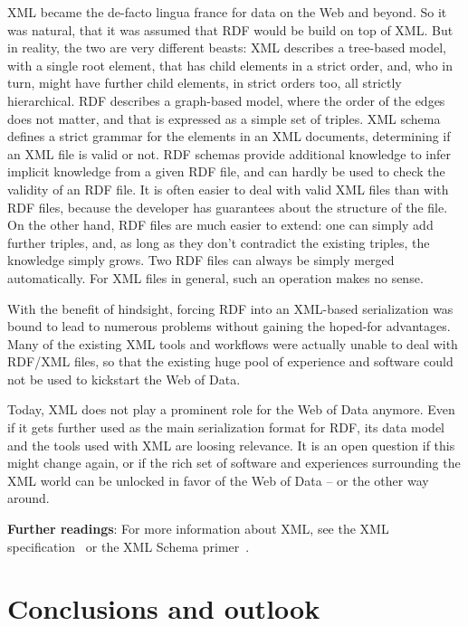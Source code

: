 XML became the de-facto lingua france for data on the Web and beyond.
So it was natural, that it was assumed that RDF would be build on top of XML.
But in reality, the two are very different beasts:
XML describes a tree-based model, with a single root element, that has child elements in a strict order, and, who in turn, might have further child elements, in strict orders too, all strictly hierarchical.
RDF describes a graph-based model, where the order of the edges does not matter, and that is expressed as a simple set of triples.
XML schema defines a strict grammar for the elements in an XML documents, determining if an XML file is valid or not.
RDF schemas provide additional knowledge to infer implicit knowledge from a given RDF file, and can hardly be used to check the validity of an RDF file.
It is often easier to deal with valid XML files than with RDF files, because the developer has guarantees about the structure of the file.
On the other hand, RDF files are much easier to extend: one can simply add further triples, and, as long as they don't contradict the existing triples, the knowledge simply grows.
Two RDF files can always be simply merged automatically. For XML files in general, such an operation makes no sense.

With the benefit of hindsight, forcing RDF into an XML-based serialization was bound to lead to numerous problems without gaining the hoped-for advantages.
Many of the existing XML tools and workflows were actually unable to deal with RDF/XML files, so that the existing huge pool of experience and software could not be used to kickstart the Web of Data.

Today, XML does not play a prominent role for the Web of Data anymore.
Even if it gets further used as the main serialization format for RDF, its data model and the tools used with XML are loosing relevance.
It is an open question if this might change again, or if the rich set of software and experiences surrounding the XML world can be unlocked in favor of the Web of Data -- or the other way around.

\medskip

\textbf{Further readings}:
For more information about XML, see the XML specification~\cite{xml} or the XML Schema primer~\cite{xml-primer}.

\section{Conclusions and outlook}
\label{conclusions}

